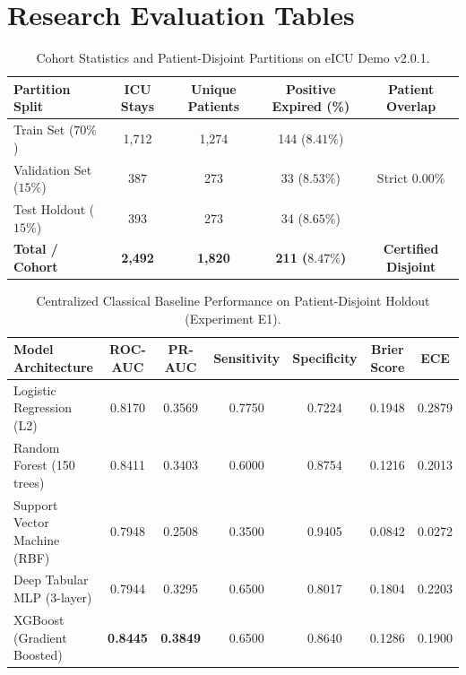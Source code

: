 \documentclass{article}
\begin{document}
\section*{Research Evaluation Tables}

\begin{table}[htbp]
\centering
\small
\caption{Cohort Statistics and Patient-Disjoint Partitions on eICU Demo v2.0.1.}
\label{tab:dataset_partitions}
\begin{tabular}{lcccc}
\toprule
\textbf{Partition Split} & \textbf{ICU Stays} & \textbf{Unique Patients} & \textbf{Positive Expired (\%)} & \textbf{Patient Overlap} \\
\midrule
Train Set ($70\%$) & 1,712 & 1,274 & 144 ($8.41\%$) & \multirow{3}{*}{Strict 0.00\%} \\
Validation Set ($15\%$) & 387 & 273 & 33 ($8.53\%$) & \\
Test Holdout ($15\%$) & 393 & 273 & 34 ($8.65\%$) & \\
\midrule
\textbf{Total / Cohort} & \textbf{2,492} & \textbf{1,820} & \textbf{211 ($8.47\%$)} & \textbf{Certified Disjoint} \\
\bottomrule
\end{tabular}
\end{table}

\vspace{1em}

\begin{table}[htbp]
\centering
\small
\caption{Centralized Classical Baseline Performance on Patient-Disjoint Holdout (Experiment E1).}
\label{tab:classical_baselines}
\begin{tabular}{lcccccc}
\toprule
\textbf{Model Architecture} & \textbf{ROC-AUC} & \textbf{PR-AUC} & \textbf{Sensitivity} & \textbf{Specificity} & \textbf{Brier Score} & \textbf{ECE} \\
\midrule
Logistic Regression (L2) & 0.8170 & 0.3569 & 0.7750 & 0.7224 & 0.1948 & 0.2879 \\
Random Forest (150 trees) & 0.8411 & 0.3403 & 0.6000 & 0.8754 & 0.1216 & 0.2013 \\
Support Vector Machine (RBF) & 0.7948 & 0.2508 & 0.3500 & 0.9405 & 0.0842 & 0.0272 \\
Deep Tabular MLP (3-layer) & 0.7944 & 0.3295 & 0.6500 & 0.8017 & 0.1804 & 0.2203 \\
XGBoost (Gradient Boosted) & \textbf{0.8445} & \textbf{0.3849} & 0.6500 & 0.8640 & 0.1286 & 0.1900 \\
\bottomrule
\end{tabular}
\end{table}
\end{document}
